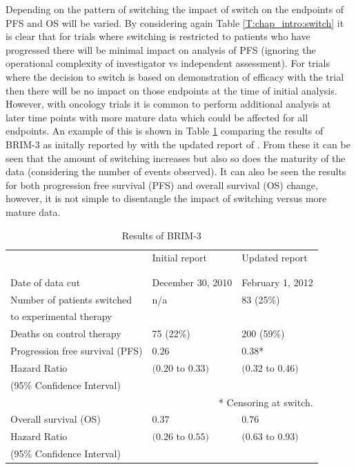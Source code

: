Depending on the pattern of switching the impact of switch on the endpoints of PFS and OS will be varied. By considering again Table \ref{T:chap_intro:switch} it is clear that for trials where switching is restricted to patients who have progressed there will be minimal impact on analysis of PFS (ignoring the operational complexity of investigator vs independent assessment). For trials where the decision to switch is based on demonstration of efficacy with the trial then there will be no impact on those endpoints at the time of initial analysis. However, with oncology trials it is common to perform additional analysis at later time points with more mature data which could be affected for all endpoints. An example of this is shown in Table \ref{T:chap_intro:BRIM3} comparing the results of BRIM-3 as initally reported by \cite{BRIM3} with the updated report of \cite{BRIM3UPDATE}. From these it can be seen that the amount of switching increases but also so does the maturity of the data (considering the number of events observed). It can also be seen the results for both progression free survival (PFS) and overall survival (OS) change, however, it is not simple to disentangle the impact of switching versus more mature data.

\begin{table}[ht] 
\caption{Results of BRIM-3}
\centering 
\begin{tabular}{ l  l l  }
\hline
\hline
                                 & Initial report      & Updated report     \\ 
                                 & \citep{BRIM3}       &  \citep{BRIM3UPDATE} \\
\hline\\[0.2cm]
Date of data cut                 & December 30, 2010   & February 1, 2012  \\[0.2cm]

Number of patients switched      & n/a                 & 83 (25\%)         \\
to experimental therapy          &                     &                    \\[0.2cm]

Deaths on control therapy        & 75 (22\%)           & 200 (59\%)        \\[0.2cm]

Progression free survival (PFS)  &  $0.26$             & $0.38$*                \\
Hazard Ratio   &  $(0.20$ to $0.33)$ & $(0.32$ to $0.46)$    \\
(95\% Confidence Interval) & & \\
\multicolumn{3}{r}{* Censoring at switch.} \\[0.2cm]

Overall survival  (OS)           &  $0.37$             & $0.76$                 \\
Hazard Ratio            &  $(0.26$ to $0.55)$ & $(0.63$ to $0.93)$     \\
(95\% Confidence Interval) & & \\
\hline
\end{tabular} 
\label{T:chap_intro:BRIM3}
\end{table}


